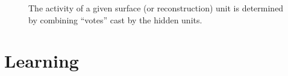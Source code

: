 \begin{figure}[t]
\caption{%
The activity of a given surface (or reconstruction) unit is determined by combining ``votes'' cast by the hidden units.}

\label{fig:voting}
\end{figure}

\section{Learning}
\label{sec:mcmm-learning}

